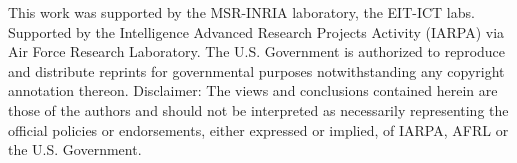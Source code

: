    \vspace*{-3mm}


\begin{acknowledgements}
   This work was supported by the MSR-INRIA laboratory, the EIT-ICT labs.
   {
   \footnotesize
   \noindent
   Supported by the Intelligence Advanced Research Projects Activity (IARPA) via Air Force Research Laboratory. The U.S. Government is authorized to reproduce and distribute reprints for governmental purposes notwithstanding any copyright annotation thereon. Disclaimer:  The views and conclusions contained herein are those of the authors and should not be interpreted as necessarily representing the official policies or endorsements, either expressed or implied, of IARPA, AFRL or the U.S. Government.
   }
\end{acknowledgements}




%

{\footnotesize

}
%




